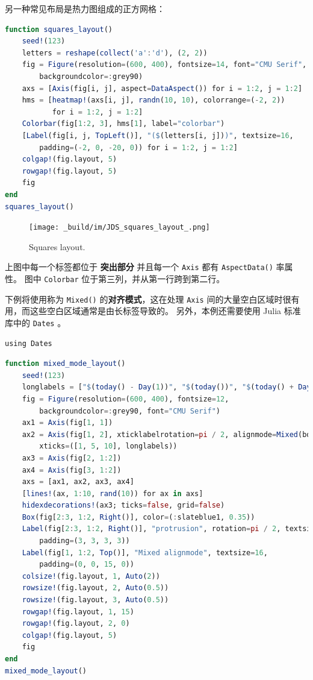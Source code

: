 \documentclass[
  notoc %
]{tufte-book}
\newcommand{\passthrough}[1]{#1}
\begin{document}
另一种常见布局是热力图组成的正方网格：

\begin{lstlisting}[language=Julia]
function squares_layout()
    seed!(123)
    letters = reshape(collect('a':'d'), (2, 2))
    fig = Figure(resolution=(600, 400), fontsize=14, font="CMU Serif",
        backgroundcolor=:grey90)
    axs = [Axis(fig[i, j], aspect=DataAspect()) for i = 1:2, j = 1:2]
    hms = [heatmap!(axs[i, j], randn(10, 10), colorrange=(-2, 2))
           for i = 1:2, j = 1:2]
    Colorbar(fig[1:2, 3], hms[1], label="colorbar")
    [Label(fig[i, j, TopLeft()], "($(letters[i, j]))", textsize=16,
        padding=(-2, 0, -20, 0)) for i = 1:2, j = 1:2]
    colgap!(fig.layout, 5)
    rowgap!(fig.layout, 5)
    fig
end
squares_layout()
\end{lstlisting}

\begin{figure}
\hypertarget{fig:squares_layout}{%
\centering
\texttt{[image: \_build/im/JDS\_squares\_layout\_.png]}
\caption{Squares layout.}\label{fig:squares_layout}
}
\end{figure}

上图中每一个标签都位于 \textbf{突出部分} 并且每一个
\passthrough{\lstinline!Axis!} 都有
\passthrough{\lstinline!AspectData()!} 率属性。 图中
\passthrough{\lstinline!Colorbar!} 位于第三列，并从第一行跨到第二行。

下例将使用称为 \passthrough{\lstinline!Mixed()!}
的\textbf{对齐模式}，这在处理 \passthrough{\lstinline!Axis!}
间的大量空白区域时很有用，而这些空白区域通常是由长标签导致的。
另外，本例还需要使用 Julia 标准库中的 \passthrough{\lstinline!Dates!} 。

\begin{lstlisting}
using Dates
\end{lstlisting}

\begin{lstlisting}[language=Julia]
function mixed_mode_layout()
    seed!(123)
    longlabels = ["$(today() - Day(1))", "$(today())", "$(today() + Day(1))"]
    fig = Figure(resolution=(600, 400), fontsize=12,
        backgroundcolor=:grey90, font="CMU Serif")
    ax1 = Axis(fig[1, 1])
    ax2 = Axis(fig[1, 2], xticklabelrotation=pi / 2, alignmode=Mixed(bottom=0),
        xticks=([1, 5, 10], longlabels))
    ax3 = Axis(fig[2, 1:2])
    ax4 = Axis(fig[3, 1:2])
    axs = [ax1, ax2, ax3, ax4]
    [lines!(ax, 1:10, rand(10)) for ax in axs]
    hidexdecorations!(ax3; ticks=false, grid=false)
    Box(fig[2:3, 1:2, Right()], color=(:slateblue1, 0.35))
    Label(fig[2:3, 1:2, Right()], "protrusion", rotation=pi / 2, textsize=14,
        padding=(3, 3, 3, 3))
    Label(fig[1, 1:2, Top()], "Mixed alignmode", textsize=16,
        padding=(0, 0, 15, 0))
    colsize!(fig.layout, 1, Auto(2))
    rowsize!(fig.layout, 2, Auto(0.5))
    rowsize!(fig.layout, 3, Auto(0.5))
    rowgap!(fig.layout, 1, 15)
    rowgap!(fig.layout, 2, 0)
    colgap!(fig.layout, 5)
    fig
end
mixed_mode_layout()
\end{lstlisting}
\end{document}
